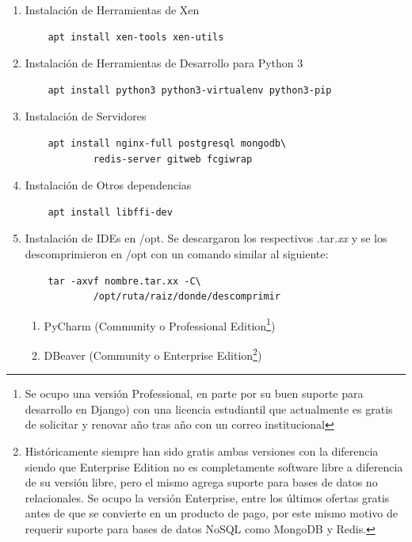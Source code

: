 \begin{enumerate}
\begin{lstlisting}
	auto xenbr0
	iface xenbr0 inet static
		address 10.10.10.1
		netmask 255.255.255.0
		bridge_ports wlan0

	#other possibly useful options in a
	#	virtualized environment
		#bridge_stp off		# disable
		#		Spanning Tree Protocol
		#bridge_waitport 0	# no delay
		#		before a port becomes
		#		available
		#bridge_fd 0		# no forwarding
		#		delay

	## configure a (separate) bridge for
	#	the DomUs without giving Dom0 an
	#	IP on it
	#auto xenbr1
	#iface xenbr1 inet manual
	#   bridge_ports eth1

	EOF

	reboot
		\end{lstlisting}
	\item Instalación de Herramientas de Xen
		\begin{lstlisting}
	apt install xen-tools xen-utils
		\end{lstlisting}
    \item Instalación de Herramientas de Desarrollo para Python 3
    	\begin{lstlisting}
	apt install python3 python3-virtualenv python3-pip
    	\end{lstlisting}
    \item Instalación de Servidores
    	\begin{lstlisting}
	apt install nginx-full postgresql mongodb\
    		redis-server gitweb fcgiwrap
    	\end{lstlisting}
    \item Instalación de Otros dependencias
    	\begin{lstlisting}
	apt install libffi-dev
    	\end{lstlisting}
    \item Instalación de IDEs en /opt. Se descargaron los respectivos .tar\textit{.xx} y se los descomprimieron en /opt con un comando similar al siguiente:
    	\begin{lstlisting}
	tar -axvf nombre.tar.xx -C\
    		/opt/ruta/raiz/donde/descomprimir
    	\end{lstlisting}
    \begin{enumerate}
    	\item PyCharm (Community o Professional Edition\footnote{Se ocupo una versión Professional, en parte por su buen suporte para desarrollo en Django) con una licencia estudiantil que actualmente es gratis de solicitar y renovar año tras año con un correo institucional})
        \item DBeaver (Community o Enterprise Edition\footnote{Históricamente siempre han sido gratis ambas versiones con la diferencia siendo que Enterprise Edition no es completamente software libre a diferencia de su versión libre, pero el mismo agrega suporte para bases de datos no relacionales. Se ocupo la versión Enterprise, entre los últimos ofertas gratis antes de que se convierte en un producto de pago, por este mismo motivo de requerir suporte para bases de datos NoSQL como MongoDB y Redis.})
    \end{enumerate}
\end{enumerate}

